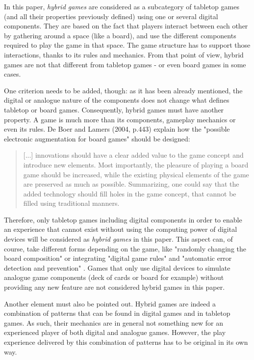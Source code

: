 In this paper, \textit{hybrid games} are considered as a subcategory of tabletop games (and all their properties previously defined) using one or several digital components. They are based on the fact that players interact between each other by gathering around a space (like a board), and use the different components required to play the game in that space. The game structure has to support those interactions, thanks to its rules and mechanics. From that point of view, hybrid games are not that different from tabletop games - or even board games in some cases.


One criterion needs to be added, though: as it has been already mentioned, the digital or analogue nature of the components does not change what defines tabletop or board games. Consequently, hybrid games must have another property. A game is much more than its components, gameplay mechanics or even its rules. De Boer and Lamers (2004, p.443) \cite{chap:aug} explain how the "possible electronic augmentation for board games" should be designed:

\begin{quotation}
[...] innovations should have a clear added value to the game concept and introduce new elements. Most importantly, the pleasure of playing a board game should be increased, while the existing physical elements of the game are preserved as much as possible. Summarizing, one could say that the added technology should fill holes in the game concept, that cannot be filled using traditional manners.
\end{quotation}

Therefore, only tabletop games including digital components in order to enable an experience that cannot exist without using the computing power of digital devices will be considered as \textit{hybrid games} in this paper. This aspect can, of course, take different forms depending on the game, like "randomly changing the board composition" or integrating "digital game rules" and "automatic error detection and prevention" \cite{chap:aug}. Games that only use digital devices to simulate analogue game components (deck of cards or board for example) without providing any new feature are not considered hybrid games in this paper.

Another element must also be pointed out. Hybrid games are indeed a combination of patterns that can be found in digital games and in tabletop games. As such, their mechanics are in general not something new for an experienced player of both digital and analogue games. However, the play experience delivered by this combination of patterns has to be original in its own way.

